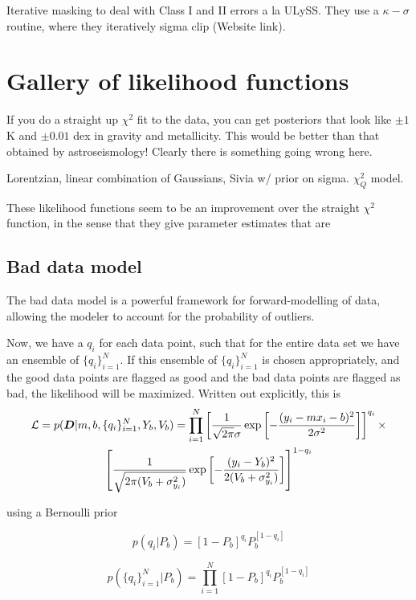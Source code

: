 \documentclass[preprint]{aastex} %
\newcommand{\qN}{\{q_i\}_{i=1}^N}
\begin{document}
Iterative masking to deal with Class I and II errors a la ULySS. They use a $\kappa - \sigma$ routine, where they iteratively sigma clip (Website link).


\section{Gallery of likelihood functions}

If you do a straight up $\chi^2$ fit to the data, you can get posteriors that look like $\pm 1$ K and $\pm 0.01$ dex in gravity and metallicity. This would be better than that obtained by astroseismology! Clearly there is something going wrong here.

Lorentzian, linear combination of Gaussians, Sivia w/ prior on sigma. $\chi^2_Q$ model.

These likelihood functions seem to be an improvement over the straight $\chi^2$ function, in the sense that they give parameter estimates that are 

\subsection{Bad data model}
The bad data model \citep{pre97,dbl10} is a powerful framework for forward-modelling of data, allowing the modeler to account for the probability of outliers.

Now, we have a $q_i$ for each data point, such that for the entire data set we have an ensemble of $\qN$. If this ensemble of $\qN$ is chosen appropriately, and the good data points are flagged as good and the bad data points are flagged as bad, the likelihood will be maximized. Written out explicitly, this is
\begin{multline}
  {\cal L} = p({\bm D} | m,b,\qN,Y_b,V_b) = \prod_{i=1}^N \left [ \frac{1}{\sqrt{2 \pi} \sigma} \exp \left[ - \frac{(y_i - m x_i - b)^2}{2 \sigma^2} \right] \right ]^{q_i}  \times \\
  \left [ \frac{1}{\sqrt{2 \pi (V_b + \sigma_{y_i}^2)}} \exp \left[ - \frac{(y_i - Y_b)^2}{2 (V_b + \sigma_{y_i}^2)} \right]
  \right ]^{1 - q_i}
\end{multline}

using a Bernoulli prior

\begin{equation}
  p(q_i | P_b) = [1-P_b]^{q_i} P_b^{[1-q_i]}
\end{equation}

\begin{equation}
  p(\qN | P_b) = \prod_{i=1}^N [1-P_b]^{q_i} P_b^{[1-q_i]}
\end{equation}
\end{document}
